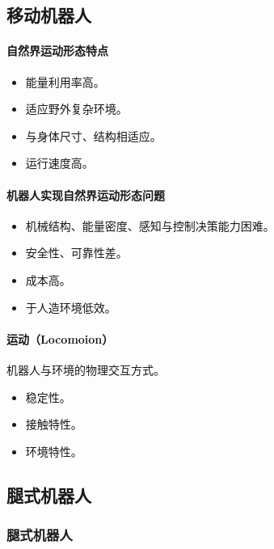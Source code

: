 \documentclass[
12pt, %
a4paper, 
oneside, %
headinclude,footinclude, %
]{scrartcl}
\begin{document}
\subsection[移动机器人]{移动机器人}
\begin{minipage}{0.45\textwidth}
\paragraph{自然界运动形态特点}
\begin{itemize}
\item 能量利用率高。
\item 适应野外复杂环境。
\item 与身体尺寸、结构相适应。
\item 运行速度高。
\end{itemize}
\end{minipage}
\hfill
\begin{minipage}{0.45\textwidth}
\paragraph{机器人实现自然界运动形态问题}
\begin{itemize}
\item 机械结构、能量密度、感知与控制决策能力困难。
\item 安全性、可靠性差。
\item 成本高。
\item 于人造环境低效。
\end{itemize}
\end{minipage}
\paragraph{运动（Locomoion）}
机器人与环境的物理交互方式。
\begin{itemize}
\item 稳定性。
\item 接触特性。
\item 环境特性。
\end{itemize}
\subsection[腿式机器人]{腿式机器人}
\subsubsection[腿式机器人]{腿式机器人}
\end{document}
